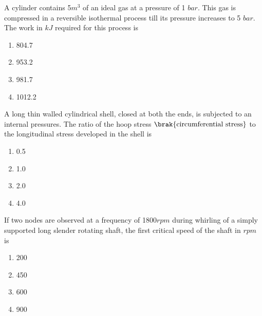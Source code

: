     \item[20.] A cylinder contains 5$m^3$ of an ideal gas at a pressure of 1 $bar$. This gas is
        compressed in a reversible isothermal process till its pressure increases to 5 $bar$. The
        work in $kJ$ required for this process is
        \hfill{}
        \begin{multicols}{4}
            \begin{enumerate}
                \item 804.7 \columnbreak
                \item 953.2 \columnbreak
                \item 981.7 \columnbreak
                \item 1012.2
            \end{enumerate}
        \end{multicols}

    \item[21.] A long thin walled cylindrical shell, closed at both the ends, is subjected to an 
        internal pressures. The ratio of the hoop stress $\brak{\textnormal{circumferential stress}}$
        to the longitudinal stress developed in the shell is
        \hfill{}
        \begin{multicols}{4}
            \begin{enumerate}
                \item 0.5 \columnbreak
                \item 1.0 \columnbreak
                \item 2.0 \columnbreak
                \item 4.0
            \end{enumerate}
        \end{multicols}

    \item[22.] If two nodes are observed at a frequency of  1800$rpm$ during whirling of a simply
        supported long slender rotating shaft, the first critical speed of the shaft in $rpm$ is
        \hfill{}
        \begin{multicols}{4}
            \begin{enumerate}
                \item 200\columnbreak
                \item 450 \columnbreak
                \item 600 \columnbreak
                \item 900
            \end{enumerate}
        \end{multicols}

